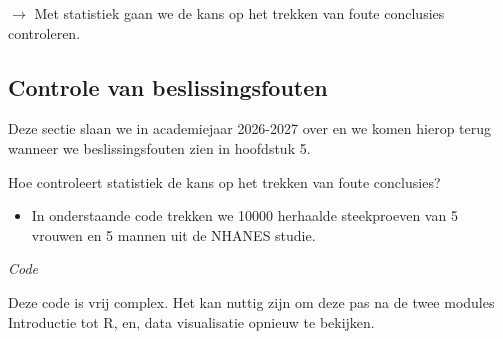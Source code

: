 \documentclass[
  dutch,
  letterpaper,
  12pt]{book}
\providecommand{\tightlist}{%
  \setlength{\itemsep}{0pt}\setlength{\parskip}{0pt}}
\theoremstyle{definition}
\theoremstyle{definition}
\theoremstyle{definition}
\theoremstyle{remark}
\begin{document}
\(\rightarrow\) Met statistiek gaan we de kans op het trekken van foute
conclusies controleren.

\subsection{Controle van
beslissingsfouten}\label{controle-van-beslissingsfouten}

Deze sectie slaan we in academiejaar 2026-2027 over en we komen hierop
terug wanneer we beslissingsfouten zien in hoofdstuk 5.

Hoe controleert statistiek de kans op het trekken van foute conclusies?

\begin{itemize}
\tightlist
\item
  In onderstaande code trekken we 10000 herhaalde steekproeven van 5
  vrouwen en 5 mannen uit de NHANES studie.
\end{itemize}

\emph{Code}

Deze code is vrij complex. Het kan nuttig zijn om deze pas na de twee
modules Introductie tot R, en, data visualisatie opnieuw te bekijken.
\end{document}
